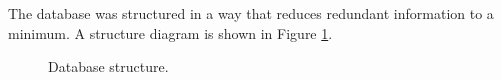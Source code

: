 The database was structured in a way that reduces redundant information to a
minimum. A structure diagram is shown in Figure \ref{fig:dbstructure}.

\begin{figure}[ht]
	\centering
	\caption{Database structure.}
	\label{fig:dbstructure}
\end{figure}

